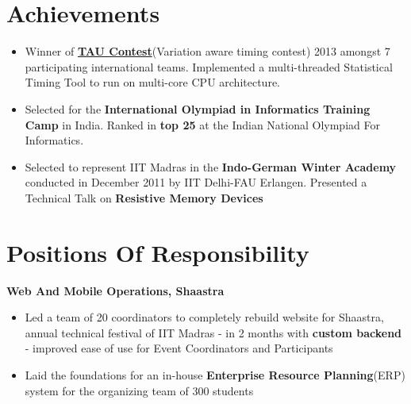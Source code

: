 \documentclass[margin,line]{resume}
\begin{document}
\begin{resume}
\section{\mysidestyle Achievements}
    \vspace{-0.0mm}
\begin{itemize}[leftmargin=*]
\item Winner of \href{https://sites.google.com/site/taucontest2013}{\textbf{TAU Contest}}(Variation aware timing contest) 2013 amongst 7 participating international teams. Implemented a multi-threaded Statistical Timing Tool to run on multi-core CPU architecture.
\item Selected for the \textbf{International Olympiad in Informatics Training Camp} in India. Ranked in \textbf{top 25} at the Indian National Olympiad For Informatics.
\item Selected to represent IIT Madras in the \textbf{Indo-German Winter Academy} conducted in December 2011 by IIT Delhi-FAU Erlangen. Presented a Technical Talk on \textbf{Resistive Memory Devices}
\end{itemize}



\section{\mysidestyle Positions Of Responsibility}
\textbf{Web And Mobile Operations, Shaastra}
\vspace{1mm}
\begin{itemize}[leftmargin=*]
\item Led a team of 20 coordinators to completely rebuild website for Shaastra, annual technical festival of IIT Madras - in 2 months with \textbf{custom backend} - improved ease of use for Event Coordinators and Participants
\item Laid the foundations for an in-house \textbf{Enterprise Resource Planning}(ERP) system for the organizing team of 300 students
\end{itemize}


\end{resume}
\end{document}
